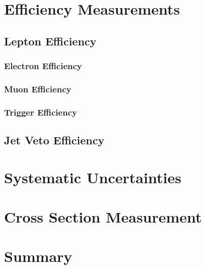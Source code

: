 \documentclass{cmspaper}
\begin{document}
\section{Efficiency Measurements}
    \label{sec:alleff}
    \subsection{Lepton Efficiency}
    \label{sec:efficiency}
    
        \subsubsection{Electron Efficiency}
        
        \label{sec:eff_electron}
        \subsubsection{Muon Efficiency}
        
        \label{sec:eff_muon}
        \subsubsection{Trigger Efficiency}
        
        \label{sec:eff_trigger}
    \subsection{Jet Veto Efficiency}
    

\section{Systematic Uncertainties}
  \label{sec:systematics}
  

  \clearpage

\section{Cross Section Measurement}
  \label{sec:xsec}
  

%  

\section{Summary}
    \label{sec:summary}
    
\end{document}
